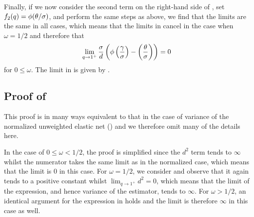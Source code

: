 Finally, if we now consider the second term on the right-hand side of
, set \(f_2(q) = \operatorname{\phi}(\theta/\sigma)\), and perform the
same steps as above, we find that the limits are the same in all cases, which means that
the limits in  cancel in the case when \(\omega = 1/2\)
and therefore that
\[
  \lim_{q \rightarrow 1^+} \frac{\sigma}{d} \left(\operatorname{\phi}\left(\frac{\gamma}{\sigma}\right) - \left(\frac{\theta}{\sigma}\right)\right) = 0
\]
for \(0 \leq \omega \). The limit in  is given by
.

\subsection{Proof of }

This proof is in many ways equivalent to that in the case of variance of the normalized
unweighted elastic net () and we therefore omit many
of the details here.

In the case of \(0 \leq \omega < 1/2\), the proof is simplified since the \(d^2\) term
tends to \(\infty\) whilst the numerator takes the same limit as in the normalized case,
which means that the limit is \(0\) in this case. For \(\omega = 1/2\), we consider
 and observe that it again tends to a positive constant
whilst \(\lim_{q\rightarrow 1^+} d^2 = 0\), which means that the limit of the expression,
and hence variance of the estimator, tends to \(\infty\). For \(\omega > 1/2\), an
identical argument for the expression in  holds and the
limit is therefore \(\infty\) in this case as well.

